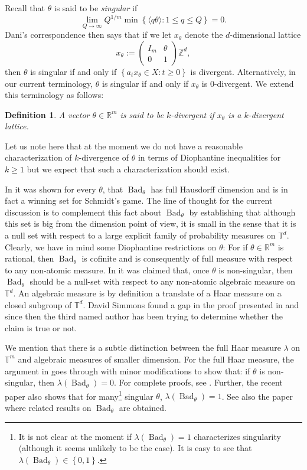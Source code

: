 \documentclass[reqno,11pt]{amsart}
\theoremstyle{plain}
\newtheorem{defn}[thm]{Definition}
\theoremstyle{definition}
\theoremstyle{remark}
\numberwithin{equation}{section}
\newcommand{\R}{{\mathbb{R}}}
\newcommand{\lam}{\lambda}
\newcommand{\bR}{\mathbb{R}}
\newcommand{\bZ}{\mathbb{Z}}
\newcommand{\bT}{\mathbb{T}}
\newcommand\seta[1]{\left\{#1\right\}}
\newcommand\pa[1]{\left(#1\right)}
\newcommand\idist[1]{\langle#1\rangle}
\newcommand\on[1]{\operatorname{#1}}
\newcommand\mat[1]{\pa{\begin{matrix}#1\end{matrix}}}
\newcommand{\xtheta}{x_{\theta}}
\begin{document}
Recall that $\theta$ is said to be \textit{singular} if 
\begin{equation}\label{eq: singular}
    \lim_{Q\to\infty} Q^{1/m}\min\seta{ \idist{q\theta}:1\le q\le Q} = 0.
\end{equation} 
Dani's correspondence then says that if we let $\xtheta$ denote the $d$-dimensional lattice
$$\xtheta := \mat{I_m &\theta \\ 0 &1 }\bZ^d,$$
then $\theta$ is singular
if and only if $\seta{a_t\xtheta \in X :t\ge 0}$ is divergent. Alternatively, in our current terminology, $\theta$ is singular if and only if $\xtheta$ is $0$-divergent. We extend this terminology as follows:
\begin{defn}
    A vector $\theta\in \bR^m$ is said to be $k$-divergent if $x_\theta$ is a $k$-divergent lattice. 
\end{defn}
Let us note here that at the moment we do not have a reasonable characterization of $k$-divergence of 
$\theta$ in terms of Diophantine inequalities
for $k\ge 1$ but we expect that such a characterization should exist.

In \cite{ET} it was shown for every $\theta$, that $\on{Bad}_\theta$ has full Hausdorff dimension and is in fact a winning set for
Schmidt's game. The line of thought for the current discussion is to complement this fact about $\on{Bad}_\theta$ by establishing that 
although this set is big from the dimension point of view, it is small in the sense that it 
is a null set with respect to a large explicit family of probability measures on $\bT^d$.
Clearly, we have in mind some Diophantine restrictions on $\theta$:
For if $\theta \in \R^m$ is rational, then $\on{Bad}_\theta$ is {cofinite} and is consequently of full measure with respect to any non-atomic measure.
In \cite{Sh1} it was claimed that, once $\theta$ is non-singular, then $\on{Bad}_\theta$ should be a null-set with respect to 
{any}
non-atomic algebraic measure on $\bT^d$.
An algebraic measure is by definition a translate of a Haar measure on a closed subgroup of $\bT^d$. 
David Simmons found a gap in the proof presented in \cite{Sh1} and since then the third named author has been trying to determine whether the claim is true or not.

We mention that there is a subtle distinction between the full Haar measure $\lambda$ on $\bT^m$ and algebraic measures of smaller dimension. For the full Haar measure, the argument in \cite{Sh1} goes through with minor modifications to show that: if $\theta$ is non-singular, then $\lambda(\on{Bad}_\theta)=0$. For complete proofs, see \cite{Ki, Mo, MRS}.
Further, the recent paper \cite{Ki} also shows that for many\footnote{It is not clear at the moment if $\lam(\on{Bad}_\theta) = 1$ characterizes singularity
(although it seems unlikely to be the case). It is easy to see that $\lam(\on{Bad}_\theta)\in\seta{0,1}$.} singular $\theta$, $\lam(\on{Bad}_\theta) =1$.
See also the paper \cite{LSS} where related results on $\on{Bad}_\theta$ are obtained.
\end{document}
